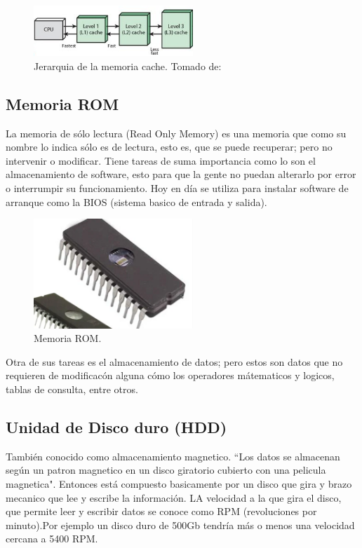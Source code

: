 \documentclass{article}
\begin{document}
\begin{figure}[h]
\includegraphics[width=6cm]{Cache.PNG}
\centering
\caption{Jerarquia de la memoria cache. \centering Tomado de:\cite{URUGUAYOC}}
\label{Cache.PNG}
\end{figure}
\subsection{Memoria ROM}
La memoria de sólo lectura (Read Only Memory) es una memoria que como su nombre lo indica sólo es de lectura, esto es, que se puede recuperar; pero no intervenir o modificar.
Tiene tareas de suma importancia como lo son el almacenamiento de software, esto para que la gente no puedan alterarlo por error o interrumpir su funcionamiento. Hoy en día se utiliza para instalar software de arranque como la BIOS (sistema basico de entrada y salida).

\begin{figure}[h]
\includegraphics[width=6cm]{ROM.PNG}
\centering
\caption{Memoria ROM.}
\label{ROM.PNG}
\end{figure}

Otra de sus tareas es el almacenamiento de datos; pero estos son datos que no requieren de modificacón alguna cómo los operadores mátematicos y logicos, tablas de consulta, entre otros.
\subsection{Unidad de Disco duro (HDD)}
 También conocido como almacenamiento magnetico. ``Los datos se almacenan según un patron magnetico en un disco giratorio cubierto con una pelicula magnetica"\cite[How computer memory works. 2:57]{TEDwebsite}. Entonces está compuesto basicamente por un disco que gira y brazo mecanico que lee y escribe la información. LA velocidad a la que gira el disco, que permite leer y escribir datos se conoce como RPM (revoluciones por minuto).Por ejemplo un disco duro de 500Gb tendría más o menos una velocidad cercana a 5400 RPM.
\end{document}
